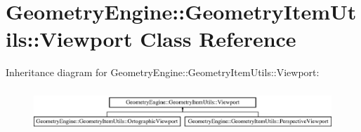 \hypertarget{class_geometry_engine_1_1_geometry_item_utils_1_1_viewport}{}\section{Geometry\+Engine\+::Geometry\+Item\+Utils\+::Viewport Class Reference}
\label{class_geometry_engine_1_1_geometry_item_utils_1_1_viewport}
Inheritance diagram for Geometry\+Engine\+::Geometry\+Item\+Utils\+::Viewport\+:\begin{figure}[H]
\begin{center}
\leavevmode
\includegraphics[height=1.637427cm]{class_geometry_engine_1_1_geometry_item_utils_1_1_viewport}
\end{center}
\end{figure}
